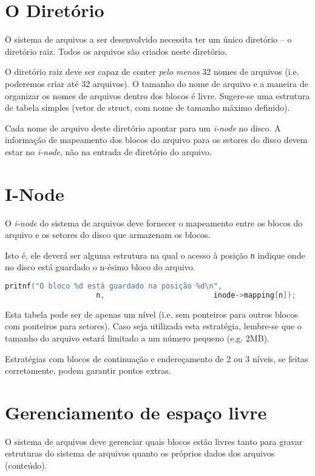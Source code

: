 \documentclass[a4paper, oneside,12pt]{article}
\begin{document}
\section{O Diretório}

O sistema de arquivos a ser desenvolvido necessita ter um único diretório -- o diretório raiz. Todos os arquivos são criados neste diretório.

O diretório raiz deve ser capaz de conter \emph{pelo menos} 32 nomes de arquivos (i.e. poderemos criar até 32 arquivos). O tamanho do nome de arquivo e a maneira de organizar os nomes de arquivos dentro dos blocos é livre. Sugere-se uma estrutura de tabela simples (vetor de struct, com nome de tamanho máximo definido).

Cada nome de arquivo deste diretório apontar para um \emph{i-node} no disco. A informação de mapeamento dos blocos do arquivo para os setores do disco devem estar no \emph{i-node}, não na entrada de diretório do arquivo.

\section{I-Node}

O \emph{i-node} do sistema de arquivos deve fornecer o mapeamento entre os blocos do arquivo e os setores do disco que armazenam os blocos.

Isto é, ele deverá ser alguma estrutura na qual o acesso à posição \texttt{n} indique onde no disco está guardado o n-ésimo bloco do arquivo.
\begin{lstlisting}[language=C]
    pritnf("O bloco %d está guardado na posição %d\n",
                     n,                         inode->mapping[n]);
\end{lstlisting}

Esta tabela pode ser de apenas um nível (i.e. sem ponteiros para outros blocos com ponteiros para setores). Caso seja utilizada esta estratégia, lembre-se que o tamanho do arquivo estará limitado a um número pequeno (e.g. 2MB).

Estratégias com blocos de continuação e endereçamento de 2 ou 3 níveis, se feitas corretamente, podem garantir pontos extras.


\section{Gerenciamento de espaço livre}
\label{sub:gerenciamento_de_espaco_livre}

O sistema de arquivos deve gerenciar quais blocos estão livres tanto para gravar estruturas do sistema de arquivos quanto os próprios dados dos arquivos (conteúdo).
\end{document}
